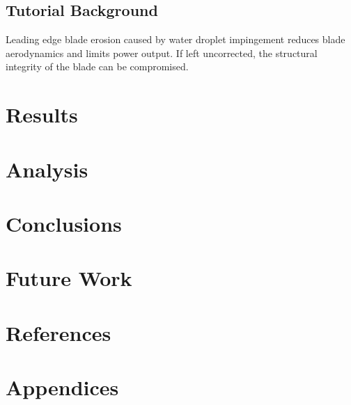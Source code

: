 \documentclass[runningheads]{llncs}
\begin{document}
\subsection{Tutorial Background} 
Leading edge blade erosion caused by water droplet impingement reduces blade aerodynamics and limits power output. If left uncorrected, the structural integrity of the blade can be compromised. 
  

\section{Results} 

\section{Analysis} 

\section{Conclusions} 

\section{Future Work}

\section{References}

\section{Appendices}  
\end{document}
